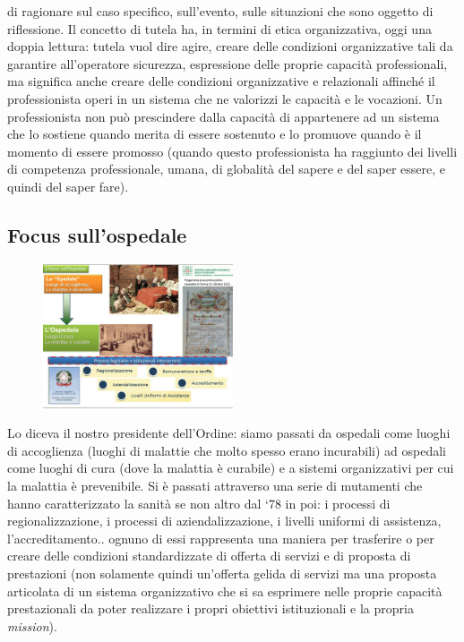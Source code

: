 di ragionare sul caso specifico, sull'evento, sulle situazioni che sono
oggetto di riflessione. Il concetto di tutela ha, in termini di etica
organizzativa, oggi una doppia lettura: tutela vuol dire agire, creare
delle condizioni organizzative tali da garantire all'operatore
sicurezza, espressione delle proprie capacità professionali, ma
significa anche creare delle condizioni organizzative e relazionali
affinché il professionista operi in un sistema che ne valorizzi le
capacità e le vocazioni. Un professionista non può prescindere dalla
capacità di appartenere ad un sistema che lo sostiene quando merita di
essere sostenuto e lo promuove quando è il momento di essere promosso
(quando questo professionista ha raggiunto dei livelli di competenza
professionale, umana, di globalità del sapere e del saper essere, e
quindi del saper fare).

\subsection{Focus sull'ospedale}

 \begin{figure}[!ht]
\centering
	\includegraphics[width=0.5\textwidth]{32/image8.jpeg}
	\end{figure}

Lo diceva il nostro presidente dell'Ordine: siamo passati da ospedali
come luoghi di accoglienza (luoghi di malattie che molto spesso erano
incurabili) ad ospedali come luoghi di cura (dove la malattia è
curabile) e a sistemi organizzativi per cui la malattia è prevenibile.
Si è passati attraverso una serie di mutamenti che hanno caratterizzato
la sanità se non altro dal `78 in poi: i processi di regionalizzazione,
i processi di aziendalizzazione, i livelli uniformi di assistenza,
l'accreditamento.. ognuno di essi rappresenta una maniera per trasferire
o per creare delle condizioni standardizzate di offerta di servizi e di
proposta di prestazioni (non solamente quindi un'offerta gelida di
servizi ma una proposta articolata di un sistema organizzativo che si sa
esprimere nelle proprie capacità prestazionali da poter realizzare i
propri obiettivi istituzionali e la propria \emph{mission}).

